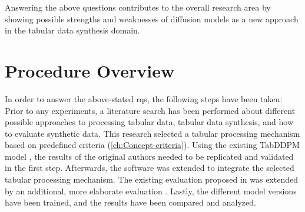 Answering the above questions contributes to the overall research area by showing possible strengths and weaknesses of diffusion models
as a new approach in the tabular data synthesis domain.

\section{Procedure Overview}
\label{ch:intro-proceeding}
In order to answer the above-stated \glspl{rq}, the following steps have been taken:
Prior to any experiments, a literature search has been performed about different possible approaches to processing tabular data, tabular data synthesis, and how to evaluate synthetic data.
This research selected a tabular processing mechanism based on predefined criteria (\autoref{ch:Concept-criteria}).
Using the existing TabDDPM model \cite{kotelnikov2022TabDDPMModellingTabular}, the results of the original authors needed to be replicated and validated in the first step.
Afterwards, the software was extended to integrate the selected tabular processing mechanism.
The existing evaluation proposed in \cite{kotelnikov2022TabDDPMModellingTabular} was extended by an additional, more elaborate evaluation \cite{akim2023TabDDPMModellingTabular}.
Lastly, the different model versions have been trained, and the results have been compared and analyzed.

